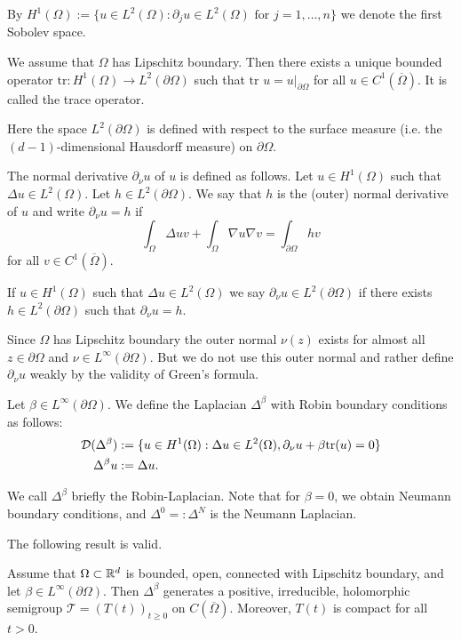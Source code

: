 By $H^1(\Omega) := \{u \in L^2(\Omega) : \partial_j u \in L^2(\Omega) \text{ for } j = 1, \ldots, n\}$ we denote the first Sobolev space.

We assume that $\Omega$ has Lipschitz boundary. Then there exists a unique bounded operator $\text{tr} : H^1(\Omega) \to L^2(\partial\Omega)$ such that $\text{tr } u = u|_{\partial\Omega}$ for all $u \in C^1(\overline{\Omega})$. It is called the trace operator.

Here the space $L^2(\partial\Omega)$ is defined with respect to the surface measure (i.e. the $(d-1)$-dimensional Hausdorff measure) on $\partial\Omega$.

The normal derivative $\partial_\nu u$ of $u$ is defined as follows. Let $u \in H^1(\Omega)$ such that $\Delta u \in L^2(\Omega)$. Let $h \in L^2(\partial\Omega)$. We say that $h$ is the (outer) normal derivative of $u$ and write $\partial_\nu u = h$ if
\[\int_\Omega \Delta u v + \int_\Omega \nabla u \nabla v = \int_{\partial\Omega} h v\]
for all $v \in C^1(\overline{\Omega})$.

If $u \in H^1(\Omega)$ such that $\Delta u \in L^2(\Omega)$ we say $\partial_\nu u \in L^2(\partial\Omega)$ if there exists $h \in L^2(\partial\Omega)$ such that $\partial_\nu u = h$.

\begin{remark}
Since $\Omega$ has Lipschitz boundary the outer normal $\nu(z)$ exists for almost all $z \in \partial\Omega$ and $\nu \in L^\infty(\partial\Omega)$. But we do not use this outer normal and rather define $\partial_\nu u$ weakly by the validity of Green's formula.
\end{remark}

Let $\beta \in L^\infty(\partial\Omega)$. We define the Laplacian $\Delta^\beta$ with Robin boundary conditions as follows:
\begin{align}
\mathcal{D}(\Delta^\beta) &:= \{u \in H^1(\Omega) : \Delta u \in L^2(\Omega), \partial_\nu u + \beta \text{tr}(u) = 0\} \\
\Delta^\beta u &:= \Delta u.
\end{align}

We call $\Delta^\beta$ briefly the Robin-Laplacian. Note that for $\beta = 0$, we obtain Neumann boundary conditions, and $\Delta^0 =: \Delta^N$ is the Neumann Laplacian.

The following result is valid.

\begin{theorem}[4.3]
Assume that $\Omega \subset \mathbb{R}^d$ is bounded, open, connected with Lipschitz boundary, and let $\beta \in L^\infty(\partial\Omega)$. Then $\Delta^\beta$ generates a positive, irreducible, holomorphic semigroup $\mathcal{T} = (T(t))_{t \geq 0}$ on $C(\overline{\Omega})$. Moreover, $T(t)$ is compact for all $t > 0$.
\end{theorem}

